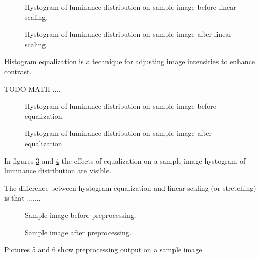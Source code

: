     \begin{figure}
        \caption{Hystogram of luminance distribution on sample image before linear scaling.}\label{fig:luminance_before}
    \end{figure}
    \begin{figure}
        \caption{Hystogram of luminance distribution on sample image after linear scaling.}\label{fig:luminance_after}
    \end{figure}
    \par{
        Histogram equalization is a technique for adjusting image intensities to enhance contrast.
    }
    \par{
        TODO MATH ....
    }
    \begin{figure}
        \caption{Hystogram of luminance distribution on sample image before equalization.}\label{fig:equalization_before}
    \end{figure}
    \begin{figure}
        \caption{Hystogram of luminance distribution on sample image after equalization.}\label{fig:equalization_after}
    \end{figure}
    \par{
        In figures \ref{fig:equalization_before} and \ref{fig:equalization_after} the effects of equalization on a sample image hystogram of luminance distribution are visible.
    }
    \par{
        The difference between hystogram equalization and linear scaling (or stretching) is that .......
    }
    \begin{figure}
        \caption{Sample image before preprocessing.}\label{fig:preprocessing_before}
    \end{figure}
    \begin{figure}
        \caption{Sample image after preprocessing.}\label{fig:preprocessing_after}
    \end{figure}
    \par{
        Pictures \ref{fig:preprocessing_before} and \ref{fig:preprocessing_after} show preprocessing output on a sample image.
    }